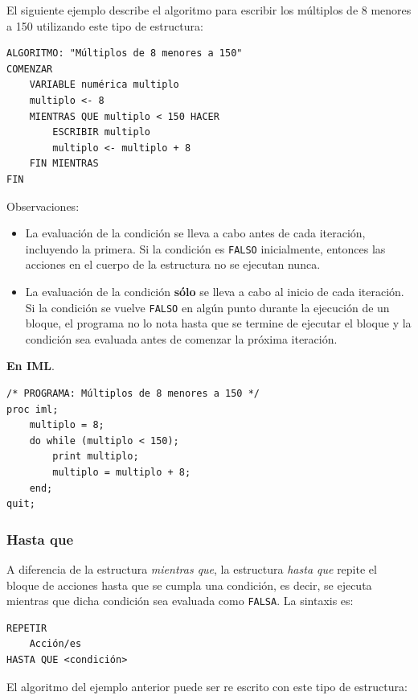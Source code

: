 \documentclass[]{book}
\providecommand{\tightlist}{%
  \setlength{\itemsep}{0pt}\setlength{\parskip}{0pt}}
\begin{document}
El siguiente ejemplo describe el algoritmo para escribir los múltiplos de 8 menores a 150 utilizando este tipo de estructura:

\begin{verbatim}
ALGORITMO: "Múltiplos de 8 menores a 150"
COMENZAR
    VARIABLE numérica multiplo
    multiplo <- 8
    MIENTRAS QUE multiplo < 150 HACER
        ESCRIBIR multiplo
        multiplo <- multiplo + 8
    FIN MIENTRAS
FIN
\end{verbatim}

Observaciones:

\begin{itemize}
\tightlist
\item
  La evaluación de la condición se lleva a cabo antes de cada iteración, incluyendo la primera. Si la condición es \texttt{FALSO} inicialmente, entonces las acciones en el cuerpo de la estructura no se ejecutan nunca.
\item
  La evaluación de la condición \textbf{sólo} se lleva a cabo al inicio de cada iteración. Si la condición se vuelve \texttt{FALSO} en algún punto durante la ejecución de un bloque, el programa no lo nota hasta que se termine de ejecutar el bloque y la condición sea evaluada antes de comenzar la próxima iteración.
\end{itemize}

\textbf{En IML}.

\begin{verbatim}
/* PROGRAMA: Múltiplos de 8 menores a 150 */
proc iml;
    multiplo = 8;
    do while (multiplo < 150);
        print multiplo;
        multiplo = multiplo + 8;
    end;
quit;
\end{verbatim}

\hypertarget{hasta-que}{%
\subsubsection{Hasta que}\label{hasta-que}}

A diferencia de la estructura \emph{mientras que}, la estructura \emph{hasta que} repite el bloque de acciones hasta que se cumpla una condición, es decir, se ejecuta mientras que dicha condición sea evaluada como \texttt{FALSA}. La sintaxis es:

\begin{verbatim}
REPETIR
    Acción/es
HASTA QUE <condición>
\end{verbatim}

El algoritmo del ejemplo anterior puede ser re escrito con este tipo de estructura:
\end{document}
